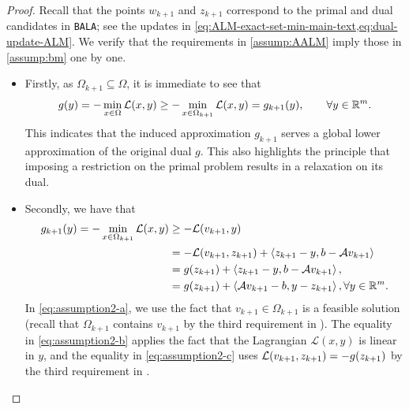 \documentclass[11pt]{article}
\newcommand{\alg}{\texttt{BALA}}%
\begin{document}
\begin{proof}
     Recall that the points $w_{k+1}$ and $z_{k+1}$ correspond to the primal and dual candidates in \alg{}; see the updates in \cref{eq:ALM-exact-set-min-main-text,eq:dual-update-ALM}. 
     We verify that the requirements in \cref{assump:AALM} imply those in \cref{assump:bm} one by one.

    \begin{itemize}
        \item 
    Firstly, as $\Omega_{k+1} \subseteq \Omega$, it is immediate to see that
        \begin{equation} \label{eq:assumption-1-PBM}
            \begin{aligned}
                g(y) = -\min_{x\in \Omega} \mathcal{L}(x,y)  \geq -\min_{x\in \Omega_{k+1}} \mathcal{L}(x,y) = g_{k+1}(y), \qquad \forall y \in \mathbb{R}^m.    
            \end{aligned}
        \end{equation}
    This indicates that the induced approximation $g_{k+1}$ serves a global lower approximation of the original dual $g$. This also highlights the principle that imposing a restriction on the primal problem results in a relaxation on its dual. 
    \item Secondly, we have that 
        \begin{subequations} \label{eq:assumption2-PBM}
            \begin{align}
            g_{k+1}(y)  = -\min_{x \in \Omega_{k+1} } \mathcal{L}(x,y) 
             & \geq -\mathcal{L}(v_{k+1},y) \label{eq:assumption2-a} \\
            &  = -\mathcal{L}(v_{k+1},z_{k+1}) + \left \langle z_{k+1} - y, b-\mathcal{A} v_{k+1}  \right\rangle \label{eq:assumption2-b} \\
            & = g(z_{k+1})+\left \langle z_{k+1} - y, b-\mathcal{A} v_{k+1} \right\rangle, \label{eq:assumption2-c} \\
            & = g(z_{k+1})+\left \langle \mathcal{A} v_{k+1} - b, y - z_{k+1} \right\rangle, \forall y \in \mathbb{R}^m.  \label{eq:assumption2-d}
            \end{align}
        \end{subequations}
        In \cref{eq:assumption2-a}, we use the fact that $v_{k+1} \in \Omega_{k+1}$ is a feasible solution (recall that $\Omega_{k+1}$ contains $v_{k+1}$ by the third requirement in ). The equality in  \cref{eq:assumption2-b} applies the fact that the Lagrangian $\mathcal{L}(x,y)$ is linear in $y$, and the equality in \cref{eq:assumption2-c} uses $\mathcal{L}(v_{k+1},z_{k+1}) = - g(z_{k+1})$ by the third requirement in . 
        

\end{itemize}
\end{proof}
\end{document}
